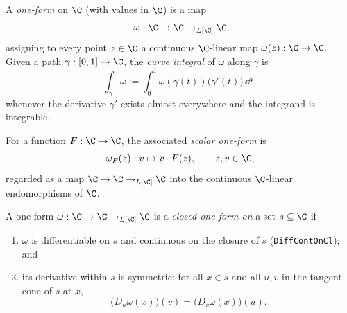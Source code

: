 \begin{definition}\label{def:one-form}\leanok
  A \emph{one-form} on $\C$ (with values in $\C$) is a map
  \[
    \omega : \C \to \C \to_{L[\C]} \C
  \]
  assigning to every point $z \in \C$ a continuous $\C$-linear map $\omega(z) : \C \to \C$. Given a
  path $\gamma : [0,1] \to \C$, the \emph{curve integral} of $\omega$ along $\gamma$ is
  \[
    \int_{\gamma} \omega := \int_0^1 \omega(\gamma(t))\bigl(\gamma'(t)\bigr) \,\dd t,
  \]
  whenever the derivative $\gamma'$ exists almost everywhere and the integrand is integrable.
\end{definition}

\begin{definition}\label{def:scalarOneForm}\leanok
  For a function $F : \C \to \C$, the associated \emph{scalar one-form} is
  \[
    \omega_F(z) : v \mapsto v \cdot F(z), \qquad z, v \in \C,
  \]
  regarded as a map $\C \to \C \to_{L[\C]} \C$ into the continuous $\C$-linear endomorphisms of
  $\C$.
\end{definition}

\begin{definition}\label{def:ClosedOneFormOn}\leanok
  A one-form $\omega : \C \to \C \to_{L[\C]} \C$ is a \emph{closed one-form on} a set
  $s \subseteq \C$ if
  \begin{enumerate}
    \item $\omega$ is differentiable on $s$ and continuous on the closure of $s$
      (\texttt{DiffContOnCl}); and
    \item its derivative within $s$ is symmetric: for all $x \in s$ and all $u, v$ in the tangent
      cone of $s$ at $x$,
      \[
        \bigl(D_u \omega(x)\bigr)(v) = \bigl(D_v \omega(x)\bigr)(u).
      \]
  \end{enumerate}
\end{definition}

